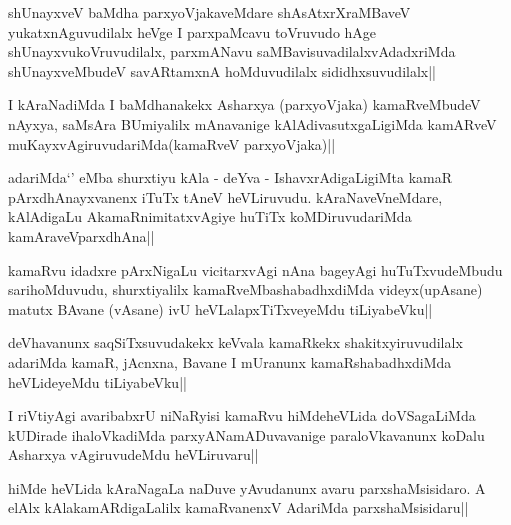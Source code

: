 
\begin{artha}
shUnayxveV baMdha parxyoVjakaveMdare shAsAtxrXraMBaveV yukatxnAguvudilalx heVge I parxpaMcavu toVruvudo hAge shUnayxvukoVruvudilalx, parxmANavu saMBavisuvadilalxvAdadxriMda shUnayxveMbudeV savARtamxnA hoMduvudilalx sididhxsuvudilalx||
\end{artha}


\begin{artha}
I kAraNadiMda I baMdhanakekx Asharxya (parxyoVjaka) kamaRveMbudeV nAyxya, saMsAra BUmiyalilx mAnavanige kAlAdivasutxgaLigiMda kamARveV muKayxvAgiruvudariMda(kamaRveV parxyoVjaka)||
\end{artha}

\begin{artha}
adariMda`\stext' eMba shurxtiyu  kAla - deYva - IshavxrAdigaLigiMta kamaR pArxdhAnayxvanenx iTuTx tAneV heVLiruvudu. kAraNaveVneMdare, kAlAdigaLu AkamaRnimitatxvAgiye huTiTx koMDiruvudariMda kamAraveVparxdhAna||
\end{artha}


\begin{artha}
kamaRvu idadxre pArxNigaLu vicitarxvAgi nAna bageyAgi huTuTxvudeMbudu sarihoMduvudu, shurxtiyalilx kamaRveMbashabadhxdiMda videyx(upAsane) matutx BAvane (vAsane) ivU heVLalapxTiTxveyeMdu tiLiyabeVku||
\end{artha}


\begin{artha}
deVhavanunx saqSiTxsuvudakekx keVvala kamaRkekx shakitxyiruvudilalx adariMda kamaR, jAcnxna, Bavane I mUranunx kamaRshabadhxdiMda heVLideyeMdu tiLiyabeVku||
\end{artha}

\begin{artha}
I riVtiyAgi avaribabxrU niNaRyisi kamaRvu hiMdeheVLida doVSagaLiMda kUDirade 
ihaloVkadiMda parxyANamADuvavanige paraloVkavanunx koDalu Asharxya vAgiruvudeMdu 
heVLiruvaru||
\end{artha}

\begin{artha}
hiMde heVLida kAraNagaLa naDuve yAvudanunx avaru parxshaMsisidaro. A elAlx kAlakamARdigaLalilx kamaRvanenxV AdariMda parxshaMsisidaru||
\end{artha}

